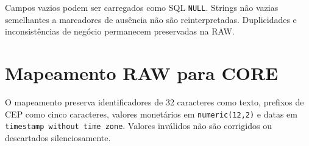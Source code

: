 \documentclass[12pt,a4paper]{article}
\begin{document}
	Campos vazios podem ser carregados como SQL \texttt{NULL}. Strings não vazias
	semelhantes a marcadores de ausência não são reinterpretadas. Duplicidades e
	inconsistências de negócio permanecem preservadas na RAW.
	
	\section{Mapeamento RAW para CORE}
	
	O mapeamento preserva identificadores de 32 caracteres como texto, prefixos de
	CEP como cinco caracteres, valores monetários em \texttt{numeric(12,2)} e datas
	em \texttt{timestamp without time zone}. Valores inválidos não são corrigidos
	ou descartados silenciosamente.
	
\end{document}
